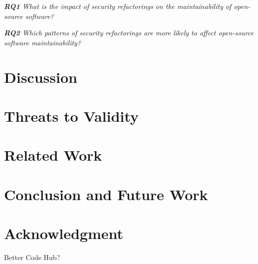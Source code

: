 \documentclass[10pt,conference]{IEEEtran}
\begin{document}
\begin{framed}
\textit{\textbf{RQ1} What is the impact of security refactorings on the maintainability of open-source software?}
\end{framed}

\begin{framed}
\textit{\textbf{RQ2} Which patterns of security refactorings are more likely to affect open-source software maintainability?}
\end{framed}

\section{Discussion}


\section{Threats to Validity}

\section{Related Work}


\section{Conclusion and Future Work}



\section*{Acknowledgment}

Better Code Hub?

{
 
  
}
\end{document}
